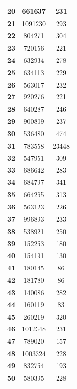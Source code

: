\begin{table}[!ht]
\begin{tabular}{|c|c|c|}
\textbf{20} & 661637 & 231 \\ \hline
\textbf{21} & 1091230 & 293 \\ \hline \rowcolor{Gray}
\textbf{22} & 804271 & 304 \\ \hline
\textbf{23} & 720156 & 221 \\ \hline \rowcolor{Gray}
\textbf{24} & 632934 & 278 \\ \hline
\textbf{25} & 634113 & 229 \\ \hline \rowcolor{Gray}
\textbf{26} & 563017 & 232 \\ \hline
\textbf{27} & 920276 & 221 \\ \hline \rowcolor{Gray}
\textbf{28} & 640287 & 246 \\ \hline
\textbf{29} & 900809 & 237 \\ \hline \rowcolor{Gray}
\textbf{30} & 536480 & 474 \\ \hline
\textbf{31} & 783558 & 23448 \\ \hline \rowcolor{Gray}
\textbf{32} & 547951 & 309 \\ \hline
\textbf{33} & 686642 & 283 \\ \hline \rowcolor{Gray}
\textbf{34} & 684797 & 341 \\ \hline
\textbf{35} & 664265 & 313 \\ \hline \rowcolor{Gray}
\textbf{36} & 563123 & 226 \\ \hline
\textbf{37} & 996893 & 233 \\ \hline \rowcolor{Gray}
\textbf{38} & 538921 & 250 \\ \hline
\textbf{39} & 152253 & 180 \\ \hline \rowcolor{Gray}
\textbf{40} & 154191 & 130 \\ \hline
\textbf{41} & 180145 & 86 \\ \hline \rowcolor{Gray}
\textbf{42} & 181780 & 86 \\ \hline
\textbf{43} & 140086 & 282 \\ \hline \rowcolor{Gray}
\textbf{44} & 160119 & 83 \\ \hline
\textbf{45} & 260219 & 320 \\ \hline \rowcolor{Gray}
\textbf{46} & 1012348 & 231 \\ \hline
\textbf{47} & 789020 & 157 \\ \hline \rowcolor{Gray}
\textbf{48} & 1003324 & 228 \\ \hline
\textbf{49} & 832754 & 193 \\ \hline \rowcolor{Gray}
\textbf{50} & 580395 & 228 \\ \hline
\end{tabular}
\end{table}


